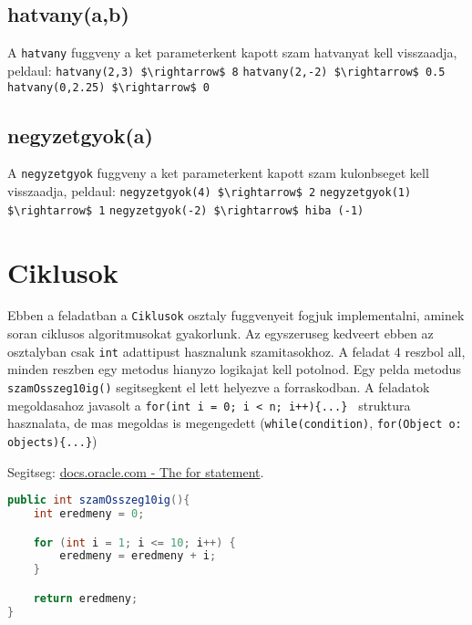 \documentclass{article}
\begin{document}
\newpage
\subsection{hatvany(a,b)}
A \lstinline{hatvany} fuggveny a ket parameterkent kapott szam hatvanyat kell visszaadja, peldaul:\newline
\lstinline[mathescape]{hatvany(2,3) $\rightarrow$ 8}\newline
\lstinline[mathescape]{hatvany(2,-2) $\rightarrow$ 0.5}\newline
\lstinline[mathescape]{hatvany(0,2.25) $\rightarrow$ 0}\newline

\subsection{negyzetgyok(a)}
A \lstinline{negyzetgyok} fuggveny a ket parameterkent kapott szam kulonbseget kell visszaadja,
peldaul:\newline
\lstinline[mathescape]{negyzetgyok(4) $\rightarrow$ 2}\newline
\lstinline[mathescape]{negyzetgyok(1) $\rightarrow$ 1}\newline
\lstinline[mathescape]{negyzetgyok(-2) $\rightarrow$ hiba (-1)}\newline

\newpage
\section{Ciklusok}

Ebben a feladatban a \lstinline{Ciklusok} osztaly fuggvenyeit fogjuk implementalni, aminek soran ciklusos algoritmusokat gyakorlunk. Az egyszeruseg kedveert ebben az osztalyban csak \lstinline{int} adattipust hasznalunk szamitasokhoz. A feladat 4 reszbol all, minden reszben egy metodus hianyzo logikajat kell potolnod. Egy pelda metodus \lstinline{szamOsszeg10ig()} segitsegkent el lett helyezve a forraskodban. A feladatok megoldasahoz javasolt a \lstinline|for(int i = 0; i < n; i++){...} | struktura hasznalata, de mas megoldas is megengedett (\lstinline{while(condition)}, \lstinline|for(Object o: objects){...}|)\

Segitseg: \href{https://docs.oracle.com/javase/tutorial/java/nutsandbolts/for.html}{docs.oracle.com - The for statement}.

\begin{lstlisting}[language=Java, caption=Pelda Metodus]
public int szamOsszeg10ig(){
    int eredmeny = 0;

    for (int i = 1; i <= 10; i++) {
        eredmeny = eredmeny + i;
    }

    return eredmeny;
}
\end{lstlisting}
\end{document}
